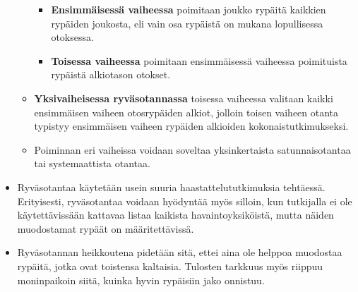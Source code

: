 \documentclass[
]{book}
\providecommand{\tightlist}{%
  \setlength{\itemsep}{0pt}\setlength{\parskip}{0pt}}
\begin{document}
\begin{itemize}
\begin{itemize}
    \begin{itemize}
    \tightlist
    \item
      \textbf{Ensimmäisessä vaiheessa} poimitaan joukko rypäitä kaikkien rypäiden joukosta, eli vain osa rypäistä on mukana lopullisessa otoksessa.\\
    \item
      \textbf{Toisessa vaiheessa} poimitaan ensimmäisessä vaiheessa poimituista rypäistä alkiotason otokset.
    \end{itemize}
  \item
    \textbf{Yksivaiheisessa ryväsotannassa} toisessa vaiheessa valitaan kaikki ensimmäisen vaiheen otosrypäiden alkiot, jolloin toisen vaiheen otanta typistyy ensimmäisen vaiheen rypäiden alkioiden kokonaistutkimukseksi.
  \item
    Poiminnan eri vaiheissa voidaan soveltaa yksinkertaista satunnaisotantaa tai systemaattista otantaa.
  \end{itemize}
\item
  Ryväsotantaa käytetään usein suuria haastattelututkimuksia tehtäessä. Erityisesti, ryväsotantaa voidaan hyödyntää myös silloin, kun tutkijalla ei ole käytettävissään kattavaa listaa kaikista havaintoyksiköistä, mutta näiden muodostamat rypäät on määritettävissä.
\item
  Ryväsotannan heikkoutena pidetään sitä, ettei aina ole helppoa muodostaa rypäitä, jotka ovat toistensa kaltaisia. Tulosten tarkkuus myös riippuu moninpaikoin siitä, kuinka hyvin rypäisiin jako onnistuu.
\end{itemize}

\newpage
\end{document}

